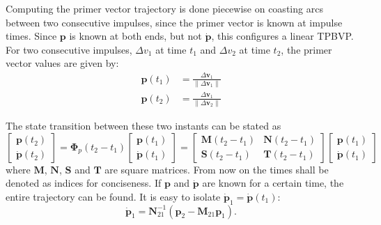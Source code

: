 Computing the primer vector trajectory is done piecewise on coasting arcs between two consecutive impulses, since the primer vector is known at impulse times. Since \(\mathbf{p}\) is known at both ends, but not \(\dot{\mathbf{p}}\), this configures a linear TPBVP\@. For two consecutive impulses, \(\Delta v_1\) at time \(t_1\) and \(\Delta v_2\) at time \(t_2\), the primer vector values are given by:
\begin{align}\label{eq:pv_deltav}
    \mathbf{p}(t_1) &= \frac{\Delta \mathbf{v}_1}{\lVert \Delta \mathbf{v}_1 \rVert} \\
    \mathbf{p}(t_2) &= \frac{\Delta \mathbf{v}_1}{\lVert \Delta \mathbf{v}_2 \rVert}
\end{align}

The state transition between these two instants can be stated as
\begin{equation}
    \begin{bmatrix}
        \mathbf{p}(t_2) \\ \dot{\mathbf{p}}(t_2)
    \end{bmatrix} = \mathbf{\Phi}_p(t_2 - t_1) \begin{bmatrix}
        \mathbf{p}(t_1) \\ \dot{\mathbf{p}}(t_1)
    \end{bmatrix} = \begin{bmatrix}
        \mathbf{M}(t_2-t_1) & \mathbf{N}(t_2-t_1) \\ \mathbf{S}(t_2-t_1) & \mathbf{T}(t_2-t_1)
    \end{bmatrix} \begin{bmatrix}
        \mathbf{p}(t_1) \\ \dot{\mathbf{p}}(t_1)
    \end{bmatrix}
\end{equation}
where \(\mathbf{M}\), \(\mathbf{N}\), \(\mathbf{S}\) and \(\mathbf{T}\) are square matrices. From now on the times shall be denoted as indices for conciseness. If \(\mathbf{p}\) and \(\dot{\mathbf{p}}\) are known for a certain time, the entire trajectory can be found. It is easy to isolate \(\dot{\mathbf{p}}_1 = \dot{\mathbf{p}}(t_1)\):
\begin{equation}
    \dot{\mathbf{p}}_1 = \mathbf{N}^{-1}_{21} \left(\mathbf{p}_2 - \mathbf{M}_{21}\mathbf{p}_1\right).
\end{equation}

